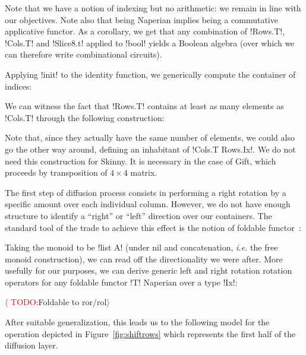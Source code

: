 \documentclass[draft,english]{jflart}
\newcommand{\TODO}[1]{\textcolor{red}{$\langle$ TODO:}#1\textcolor{red}{$\rangle$}}
\newcommand{\ie}{\textit{i.e.}}
\begin{document}
Note that we have a notion of indexing but no arithmetic: we remain in
line with our objectives. Note also that being Naperian implies being
a commutative applicative functor. As a corollary, we get that any
combination of \coqe!Rows.T!, \coqe!Cols.T! and \coqe!Slice8.t!
applied to \coqe!bool! yields a Boolean algebra (over which we can
therefore write combinational circuits).


Applying \coqe!init! to the identity function, we generically compute
the container of indices:
%

We can witness the fact that \coqe!Rows.T! contains at least as many
elements as \coqe!Cols.T! through the following construction:
%

Note that, since they actually have the same number of elements, we
could also go the other way around, defining an inhabitant of
\coqe!Cols.T Rows.Ix!. We do not need this construction for Skinny. It
is necessary in the case of Gift, which proceeds by transposition of
$4 \times 4$ matrix.


The first step of diffusion process consists in performing a right
rotation by a specific amount over each individual column. However, we
do not have enough structure to identify a ``right'' or ``left''
direction over our containers. The standard tool of the trade to
achieve this effect is the notion of foldable
functor~\citep{foldable}:
%

Taking the monoid to be \coqe!list A! (under nil and concatenation,
\ie{} the free monoid construction), we can read off the
directionality we were after.
%
More usefully for our purposes, we can derive generic left and right
rotation rotation operators for any foldable functor \coqe!T! Naperian
over a type \coqe!Ix!:
%

\TODO{Foldable to ror/rol}


After suitable generalization, this leads us to the following model
for the operation depicted in Figure~\ref{fig:shiftrows}
%
%
which represents the first half of the diffusion layer.
\end{document}
